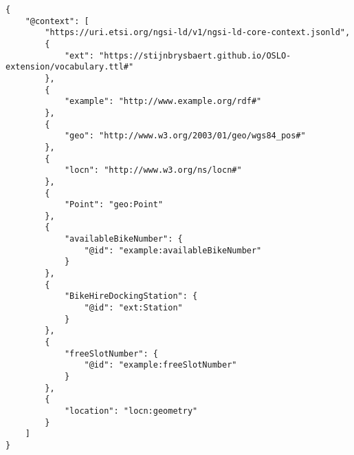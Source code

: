 \begin{code}
\begin{verbatim}
{
    "@context": [
        "https://uri.etsi.org/ngsi-ld/v1/ngsi-ld-core-context.jsonld",
        {
            "ext": "https://stijnbrysbaert.github.io/OSLO-extension/vocabulary.ttl#"
        },
        {
            "example": "http://www.example.org/rdf#"
        },
        {
            "geo": "http://www.w3.org/2003/01/geo/wgs84_pos#"
        },
        {
            "locn": "http://www.w3.org/ns/locn#"
        },
        {
            "Point": "geo:Point"
        },
        {
            "availableBikeNumber": {
                "@id": "example:availableBikeNumber"
            }
        },
        {
            "BikeHireDockingStation": {
                "@id": "ext:Station"
            }
        },
        {
            "freeSlotNumber": {
                "@id": "example:freeSlotNumber"
            }
        },
        {
            "location": "locn:geometry"
        }
    ]
}
\end{verbatim}
\end{code}